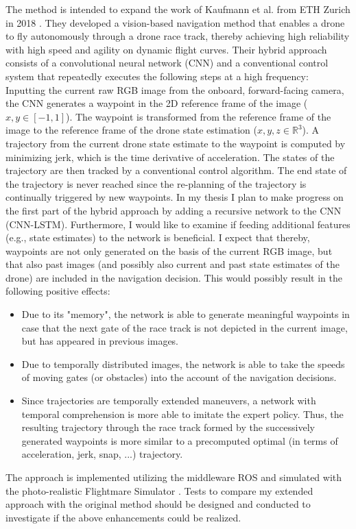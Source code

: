 The method is intended to expand the work of Kaufmann et al. from ETH Zurich in 2018 \cite{Kaufmann2018}.
They developed a vision-based navigation method that enables a drone to fly autonomously 
through a drone race track, thereby
achieving high reliability with high speed and agility on dynamic flight curves. 
Their hybrid approach consists of a convolutional neural network (CNN) and a conventional control system that repeatedly executes the following steps at a high frequency:
Inputting the current raw RGB image from the onboard, forward-facing camera, the CNN generates a waypoint in the 2D reference frame of the image ($x, y \in [-1, 1]$).
The waypoint is transformed from the reference frame of the image to the reference frame of the drone state estimation ($x, y, z \in \mathbb R^3$). 
A trajectory from the current drone state estimate to the waypoint is computed by minimizing jerk, which is the time derivative of acceleration.
The states of the trajectory are then tracked by a conventional control algorithm.
The end state of the trajectory is never reached since the re-planning of the trajectory is continually triggered by new waypoints.
In my thesis I plan to make progress on the first part of the hybrid approach 
by adding a recursive network to the CNN (CNN-LSTM).
Furthermore, I would like to examine if feeding additional features (e.g., state estimates) to the network is beneficial.
I expect that thereby, 
waypoints are not only generated on the basis of the current RGB image, 
but that also past images (and possibly also current and past state estimates of the drone) are included in the navigation decision.
This would possibly result in the following positive effects:
\begin{itemize}
	\item Due to its "memory", the network is able to generate meaningful waypoints in case that the next gate of the race track is not depicted in the current image, but has appeared in previous images.
	\item Due to temporally distributed images, the network is able to take the speeds of moving gates (or obstacles) into the account of the navigation decisions.
	\item Since trajectories are temporally extended maneuvers, a network with temporal comprehension is more able to imitate the expert policy.
	Thus, the resulting trajectory through the race track formed by the successively generated waypoints is more similar to a precomputed optimal (in terms of acceleration, jerk, snap, ...) trajectory.
\end{itemize}
The approach is implemented utilizing the middleware ROS \cite{ros}
and simulated with the photo-realistic Flightmare Simulator \cite{song2020flightmare}.
Tests to compare my extended approach with the original method should be designed
and conducted to investigate if the above enhancements could be realized.



